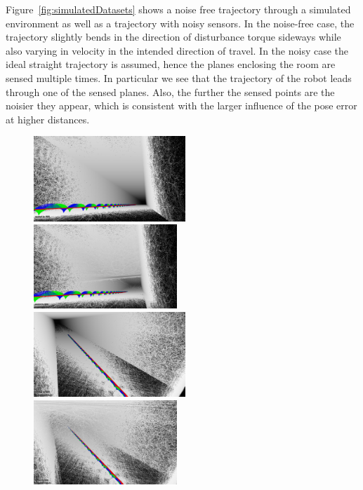 Figure~\ref{fig:simulatedDatasets} shows a noise free trajectory through a simulated environment as well as a trajectory with noisy sensors.
In the noise-free case, the trajectory slightly bends in the direction of disturbance torque sideways while also varying in velocity in the intended direction of travel.
In the noisy case the ideal straight trajectory is assumed, hence the planes enclosing the room are sensed multiple times. 
In particular we see that the trajectory of the robot leads through one of the sensed planes. 
Also, the further the sensed points are the noisier they appear, which is consistent with the larger influence of the pose error at higher distances.  

\begin{figure}
	\centering
	\includegraphics[width=0.51\textwidth]{images/perfect_bottom}\hfill
	\includegraphics[width=0.48\textwidth]{images/noisy_pose_and_range_bottom}\\
	\includegraphics[width=0.51\textwidth]{images/perfect_top}\hfill
	\includegraphics[width=0.48\textwidth]{images/noisy_pose_and_range_top}\\

\end{figure}
